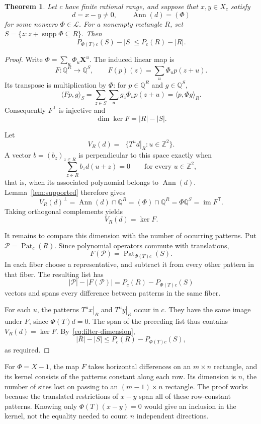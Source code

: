 \documentclass[11pt,a4paper,reqno]{amsart}
\newtheorem{theorem}{Theorem}[section]
\theoremstyle{remark}
\newcommand{\Z}{\mathbb Z}
\newcommand{\Q}{\mathbb Q}
\newcommand{\LL}{\mathcal L}
\newcommand{\mon}[1]{\boldsymbol X^{#1}}
\newcommand{\restr}[2]{\left.#1\right|_{#2}}
\DeclareMathOperator{\Ann}{Ann}
\DeclareMathOperator{\supp}{supp}
\DeclareMathOperator{\Pat}{Pat}
\DeclareMathOperator{\spanQ}{span_{\Q}}
\numberwithin{equation}{section}
\begin{document}
\begin{theorem}\label{thm:descent}
Let $c$ have finite rational range, and suppose that $x,y\in X_c$ satisfy
\[
 d=x-y\ne0,\qquad \Ann(d)=(\Phi)
\]
for some nonzero $\Phi\in\LL$. For a nonempty rectangle $R$, set
$S=\{z:z+\supp\Phi\subseteq R\}$. Then
\begin{equation}\label{eq:descent}
 P_{\Phi(T)c}(S)-|S|\le P_c(R)-|R|.
\end{equation}
\end{theorem}
\begin{proof}
Write $\Phi=\sum_u\Phi_u\mon u$. The induced linear map is
\[
 F:\Q^R\longrightarrow\Q^S,\qquad
 F(p)(z)=\sum_u\Phi_u p(z+u).
\]
Its transpose is multiplication by $\Phi$: for $p\in\Q^R$ and $g\in\Q^S$,
\[
 \langle Fp,g\rangle_S
 =\sum_{z\in S}\sum_u g_z\Phi_u p(z+u)
 =\langle p,\Phi g\rangle_R.
\]
Consequently $F^{\mathsf T}$ is injective and
\begin{equation}\label{eq:filter-dimension}
 \dim\ker F=|R|-|S|.
\end{equation}

Let
\[
 V_R(d)=\spanQ\{\restr{T^u d}{R}:u\in\Z^2\}.
\]
A vector $b=(b_z)_{z\in R}$ is perpendicular to this space exactly when
\[
 \sum_{z\in R}b_zd(u+z)=0\qquad\text{for every }u\in\Z^2,
\]
that is, when its associated polynomial belongs to $\Ann(d)$. Lemma~\ref{lem:supported} therefore gives
\[
 V_R(d)^\perp=\Ann(d)\cap\Q^R
 =(\Phi)\cap\Q^R=\Phi\Q^S=\operatorname{im}F^{\mathsf T}.
\]
Taking orthogonal complements yields
\begin{equation}\label{eq:full-kernel}
 V_R(d)=\ker F.
\end{equation}

It remains to compare this dimension with the number of occurring patterns. Put $\mathcal P=\Pat_c(R)$. Since polynomial operators commute with translations,
\[
 F(\mathcal P)=\Pat_{\Phi(T)c}(S).
\]
In each fiber choose a representative, and subtract it from every other pattern in that fiber. The resulting list has
\[
 |\mathcal P|-|F(\mathcal P)|=P_c(R)-P_{\Phi(T)c}(S)
\]
vectors and spans every difference between patterns in the same fiber.

For each $u$, the patterns $\restr{T^u x}{R}$ and $\restr{T^u y}{R}$ occur in $c$. They have the same image under $F$, since $\Phi(T)d=0$. The span of the preceding list thus contains $V_R(d)=\ker F$. By~\eqref{eq:filter-dimension},
\[
 |R|-|S|\le P_c(R)-P_{\Phi(T)c}(S),
\]
as required.
\end{proof}

For $\Phi=X-1$, the map $F$ takes horizontal differences on an $m\times n$ rectangle, and its kernel consists of the patterns constant along each row. Its dimension is $n$, the number of sites lost on passing to an $(m-1)\times n$ rectangle. The proof works because the translated restrictions of $x-y$ span all of these row-constant patterns. Knowing only $\Phi(T)(x-y)=0$ would give an inclusion in the kernel, not the equality needed to count $n$ independent directions.
\end{document}
